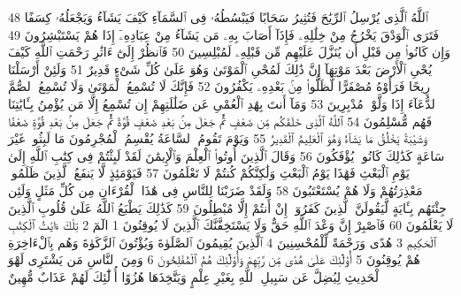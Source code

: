 {\tiny\colorbox{cl_aya}{48}} ٱللَّهُ ٱلَّذِى يُرْسِلُ ٱلرِّيَٰحَ فَتُثِيرُ سَحَابًا فَيَبْسُطُهُۥ فِى ٱلسَّمَآءِ كَيْفَ يَشَآءُ وَيَجْعَلُهُۥ كِسَفًا فَتَرَى ٱلْوَدْقَ يَخْرُجُ مِنْ خِلَٰلِهِۦ فَإِذَآ أَصَابَ بِهِۦ مَن يَشَآءُ مِنْ عِبَادِهِۦٓ إِذَا هُمْ يَسْتَبْشِرُونَ
{\tiny\colorbox{cl_aya}{49}} وَإِن كَانُوا۟ مِن قَبْلِ أَن يُنَزَّلَ عَلَيْهِم مِّن قَبْلِهِۦ لَمُبْلِسِينَ
{\tiny\colorbox{cl_aya}{50}} فَٱنظُرْ إِلَىٰٓ ءَاثَٰرِ رَحْمَتِ ٱللَّهِ كَيْفَ يُحْىِ ٱلْأَرْضَ بَعْدَ مَوْتِهَآ إِنَّ ذَٰلِكَ لَمُحْىِ ٱلْمَوْتَىٰ وَهُوَ عَلَىٰ كُلِّ شَىْءٍ قَدِيرٌ
{\tiny\colorbox{cl_aya}{51}} وَلَئِنْ أَرْسَلْنَا رِيحًا فَرَأَوْهُ مُصْفَرًّا لَّظَلُّوا۟ مِنۢ بَعْدِهِۦ يَكْفُرُونَ
{\tiny\colorbox{cl_aya}{52}} فَإِنَّكَ لَا تُسْمِعُ ٱلْمَوْتَىٰ وَلَا تُسْمِعُ ٱلصُّمَّ ٱلدُّعَآءَ إِذَا وَلَّوْا۟ مُدْبِرِينَ
{\tiny\colorbox{cl_aya}{53}} وَمَآ أَنتَ بِهَٰدِ ٱلْعُمْىِ عَن ضَلَٰلَتِهِمْ إِن تُسْمِعُ إِلَّا مَن يُؤْمِنُ بِـَٔايَٰتِنَا فَهُم مُّسْلِمُونَ
{\tiny\colorbox{cl_aya}{54}} ٱللَّهُ ٱلَّذِى خَلَقَكُم مِّن ضَعْفٍ ثُمَّ جَعَلَ مِنۢ بَعْدِ ضَعْفٍ قُوَّةً ثُمَّ جَعَلَ مِنۢ بَعْدِ قُوَّةٍ ضَعْفًا وَشَيْبَةً يَخْلُقُ مَا يَشَآءُ وَهُوَ ٱلْعَلِيمُ ٱلْقَدِيرُ
{\tiny\colorbox{cl_aya}{55}} وَيَوْمَ تَقُومُ ٱلسَّاعَةُ يُقْسِمُ ٱلْمُجْرِمُونَ مَا لَبِثُوا۟ غَيْرَ سَاعَةٍ كَذَٰلِكَ كَانُوا۟ يُؤْفَكُونَ
{\tiny\colorbox{cl_aya}{56}} وَقَالَ ٱلَّذِينَ أُوتُوا۟ ٱلْعِلْمَ وَٱلْإِيمَٰنَ لَقَدْ لَبِثْتُمْ فِى كِتَٰبِ ٱللَّهِ إِلَىٰ يَوْمِ ٱلْبَعْثِ فَهَٰذَا يَوْمُ ٱلْبَعْثِ وَلَٰكِنَّكُمْ كُنتُمْ لَا تَعْلَمُونَ
{\tiny\colorbox{cl_aya}{57}} فَيَوْمَئِذٍ لَّا يَنفَعُ ٱلَّذِينَ ظَلَمُوا۟ مَعْذِرَتُهُمْ وَلَا هُمْ يُسْتَعْتَبُونَ
{\tiny\colorbox{cl_aya}{58}} وَلَقَدْ ضَرَبْنَا لِلنَّاسِ فِى هَٰذَا ٱلْقُرْءَانِ مِن كُلِّ مَثَلٍ وَلَئِن جِئْتَهُم بِـَٔايَةٍ لَّيَقُولَنَّ ٱلَّذِينَ كَفَرُوٓا۟ إِنْ أَنتُمْ إِلَّا مُبْطِلُونَ
{\tiny\colorbox{cl_aya}{59}} كَذَٰلِكَ يَطْبَعُ ٱللَّهُ عَلَىٰ قُلُوبِ ٱلَّذِينَ لَا يَعْلَمُونَ
{\tiny\colorbox{cl_aya}{60}} فَٱصْبِرْ إِنَّ وَعْدَ ٱللَّهِ حَقٌّ وَلَا يَسْتَخِفَّنَّكَ ٱلَّذِينَ لَا يُوقِنُونَ
{\tiny\colorbox{cl_aya}{1}} الٓمٓ
{\tiny\colorbox{cl_aya}{2}} تِلْكَ ءَايَٰتُ ٱلْكِتَٰبِ ٱلْحَكِيمِ
{\tiny\colorbox{cl_aya}{3}} هُدًى وَرَحْمَةً لِّلْمُحْسِنِينَ
{\tiny\colorbox{cl_aya}{4}} ٱلَّذِينَ يُقِيمُونَ ٱلصَّلَوٰةَ وَيُؤْتُونَ ٱلزَّكَوٰةَ وَهُم بِٱلْءَاخِرَةِ هُمْ يُوقِنُونَ
{\tiny\colorbox{cl_aya}{5}} أُو۟لَٰٓئِكَ عَلَىٰ هُدًى مِّن رَّبِّهِمْ وَأُو۟لَٰٓئِكَ هُمُ ٱلْمُفْلِحُونَ
{\tiny\colorbox{cl_aya}{6}} وَمِنَ ٱلنَّاسِ مَن يَشْتَرِى لَهْوَ ٱلْحَدِيثِ لِيُضِلَّ عَن سَبِيلِ ٱللَّهِ بِغَيْرِ عِلْمٍ وَيَتَّخِذَهَا هُزُوًا أُو۟لَٰٓئِكَ لَهُمْ عَذَابٌ مُّهِينٌ
